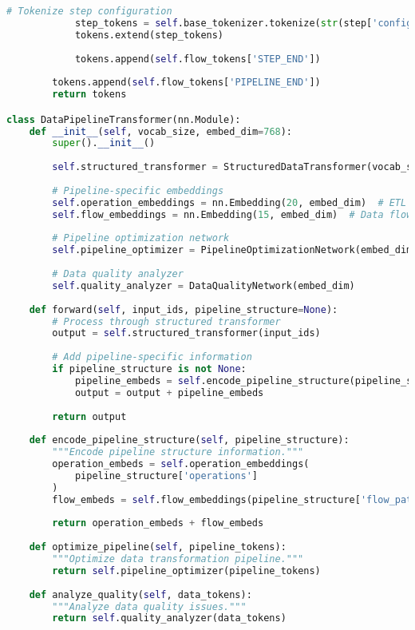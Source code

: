 \begin{lstlisting}[language=Python, caption=Data transformation and ETL tokenization]
            # Tokenize step configuration
            step_tokens = self.base_tokenizer.tokenize(str(step['config']))
            tokens.extend(step_tokens)
            
            tokens.append(self.flow_tokens['STEP_END'])
        
        tokens.append(self.flow_tokens['PIPELINE_END'])
        return tokens

class DataPipelineTransformer(nn.Module):
    def __init__(self, vocab_size, embed_dim=768):
        super().__init__()
        
        self.structured_transformer = StructuredDataTransformer(vocab_size, embed_dim)
        
        # Pipeline-specific embeddings
        self.operation_embeddings = nn.Embedding(20, embed_dim)  # ETL operations
        self.flow_embeddings = nn.Embedding(15, embed_dim)  # Data flow patterns
        
        # Pipeline optimization network
        self.pipeline_optimizer = PipelineOptimizationNetwork(embed_dim)
        
        # Data quality analyzer
        self.quality_analyzer = DataQualityNetwork(embed_dim)
        
    def forward(self, input_ids, pipeline_structure=None):
        # Process through structured transformer
        output = self.structured_transformer(input_ids)
        
        # Add pipeline-specific information
        if pipeline_structure is not None:
            pipeline_embeds = self.encode_pipeline_structure(pipeline_structure)
            output = output + pipeline_embeds
        
        return output
    
    def encode_pipeline_structure(self, pipeline_structure):
        """Encode pipeline structure information."""
        operation_embeds = self.operation_embeddings(
            pipeline_structure['operations']
        )
        flow_embeds = self.flow_embeddings(pipeline_structure['flow_pattern'])
        
        return operation_embeds + flow_embeds
    
    def optimize_pipeline(self, pipeline_tokens):
        """Optimize data transformation pipeline."""
        return self.pipeline_optimizer(pipeline_tokens)
    
    def analyze_quality(self, data_tokens):
        """Analyze data quality issues."""
        return self.quality_analyzer(data_tokens)


\end{lstlisting}
